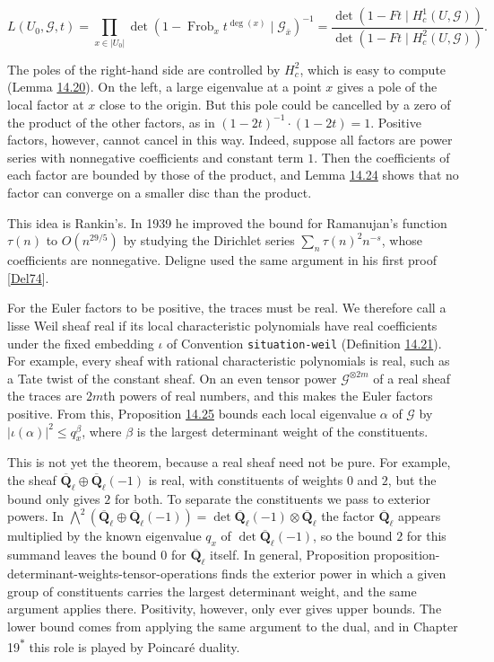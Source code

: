 \documentclass[11pt]{article}
\newcommand{\bpout}[1]{#1\textsuperscript{\hyperlink{bp-outside}{\ensuremath{\ast}}}}
\newcommand{\bpslug}[1]{\texttt{#1}}
\begin{document}
\[
L(U_0,\mathcal G,t)
=\prod_{x\in|U_0|}\det(1-\operatorname{Frob}_xt^{\deg(x)}\mid\mathcal G_{\bar x})^{-1}
=\frac{\det(1-Ft\mid H^1_c(U,\mathcal G))}{\det(1-Ft\mid H^2_c(U,\mathcal G))}.
\]

The poles of the right-hand side are controlled by \(H^2_c\), which is easy to compute (Lemma \hyperref[bp66]{14.20}). On the left, a large eigenvalue at a point \(x\) gives a pole of the local factor at \(x\) close to the origin. But this pole could be cancelled by a zero of the product of the other factors, as in \((1-2t)^{-1}\cdot(1-2t)=1\). Positive factors, however, cannot cancel in this way. Indeed, suppose all factors are power series with nonnegative coefficients and constant term \(1\). Then the coefficients of each factor are bounded by those of the product, and Lemma \hyperref[bp75]{14.24} shows that no factor can converge on a smaller disc than the product.

This idea is Rankin's. In 1939 he improved the bound for Ramanujan's function \(\tau(n)\) to \(O(n^{29/5})\) by studying the Dirichlet series \(\sum_n\tau(n)^2n^{-s}\), whose coefficients are nonnegative. Deligne used the same argument in his first proof [\hyperref[bp84]{Del74}].

For the Euler factors to be positive, the traces must be real. We therefore call a lisse Weil sheaf real if its local characteristic polynomials have real coefficients under the fixed embedding \(\iota\) of Convention \bpslug{situation-{}\allowbreak{}weil} (Definition \hyperref[bp69]{14.21}). For example, every sheaf with rational characteristic polynomials is real, such as a Tate twist of the constant sheaf. On an even tensor power \(\mathcal G^{\otimes2m}\) of a real sheaf the traces are \(2m\)th powers of real numbers, and this makes the Euler factors positive. From this, Proposition \hyperref[bp78]{14.25} bounds each local eigenvalue \(\alpha\) of \(\mathcal G\) by \(|\iota(\alpha)|^2\le q_x^\beta\), where \(\beta\) is the largest determinant weight of the constituents.

This is not yet the theorem, because a real sheaf need not be pure. For example, the sheaf \(\overline{\mathbf Q}_\ell\oplus\overline{\mathbf Q}_\ell(-1)\) is real, with constituents of weights \(0\) and \(2\), but the bound only gives \(2\) for both. To separate the constituents we pass to exterior powers. In \(\bigwedge^2(\overline{\mathbf Q}_\ell\oplus\overline{\mathbf Q}_\ell(-1))=\det\overline{\mathbf Q}_\ell(-1)\otimes\overline{\mathbf Q}_\ell\) the factor \(\overline{\mathbf Q}_\ell\) appears multiplied by the known eigenvalue \(q_x\) of \(\det\overline{\mathbf Q}_\ell(-1)\), so the bound \(2\) for this summand leaves the bound \(0\) for \(\overline{\mathbf Q}_\ell\) itself. In general, Proposition proposition-determinant-weights-tensor-operations finds the exterior power in which a given group of constituents carries the largest determinant weight, and the same argument applies there. Positivity, however, only ever gives upper bounds. The lower bound comes from applying the same argument to the dual, and in Chapter \bpout{19} this role is played by Poincaré duality.
\end{document}
